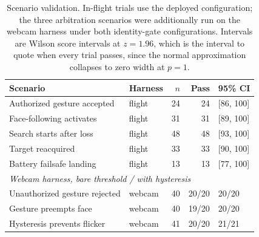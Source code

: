 \begin{table}[t]
\caption{Scenario validation. In-flight trials use the deployed configuration;
the three arbitration scenarios were additionally run on the webcam harness under
both identity-gate configurations. Intervals are Wilson score intervals at
$z=1.96$, which is the interval to quote when every trial passes, since the
normal approximation collapses to zero width at $p=1$.}
\label{tab:scenarios}
\centering
\footnotesize
\setlength{\tabcolsep}{4pt}
\renewcommand{\arraystretch}{1.02}
\begin{tabular}{@{}llrrl@{}}
\toprule
Scenario & Harness & $n$ & Pass & 95\% CI \\
\midrule
Authorized gesture accepted & flight & 24 & 24 & [86, 100] \\
Face-following activates & flight & 31 & 31 & [89, 100] \\
Search starts after loss & flight & 48 & 48 & [93, 100] \\
Target reacquired & flight & 33 & 33 & [90, 100] \\
Battery failsafe landing & flight & 13 & 13 & [77, 100] \\
\midrule
\multicolumn{5}{l}{\emph{Webcam harness, bare threshold / with hysteresis}} \\
Unauthorized gesture rejected & webcam & 40 & 20/20 & 20/20 \\
Gesture preempts face & webcam & 40 & 19/20 & 20/20 \\
Hysteresis prevents flicker & webcam & 41 & 20/20 & 21/21 \\
\bottomrule
\end{tabular}
\end{table}
